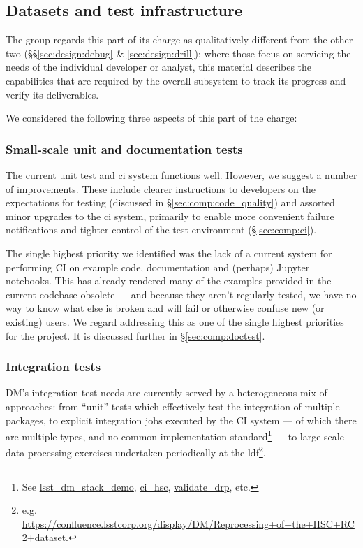 \subsection{Datasets and test infrastructure}
\label{sec:design:test}

The group regards this part of its charge as qualitatively different from the
other two (\S\S\ref{sec:design:debug} \& \ref{sec:design:drill}): where those
focus on servicing the needs of the individual developer or analyst, this
material describes the capabilities that are required by the overall subsystem
to track its progress and verify its deliverables.

We considered the following three aspects of this part of the charge:

\subsubsection{Small-scale unit and documentation tests}

The current unit test and \gls{ci} system functions well. However, we suggest
a number of improvements. These include clearer instructions to developers on
the expectations for testing (discussed in \S\ref{sec:comp:code_quality}) and
assorted minor upgrades to the \gls{ci} system, primarily to enable more
convenient failure notifications and tighter control of the test environment
(\S\ref{sec:comp:ci}).

The single highest priority we identified was the lack of a current system for
performing CI on example code, documentation and (perhaps) Jupyter notebooks.
This has already rendered many of the examples provided in the current
codebase obsolete --- and because they aren't regularly tested, we have no way
to know what else is broken and will fail or otherwise confuse new (or
existing) users. We regard addressing this as one of the single highest
priorities for the project. It is discussed further in
\S\ref{sec:comp:doctest}.

\subsubsection{Integration tests}
\label{sec:design:test:integration}

DM's integration test needs are currently served by a heterogeneous mix of
approaches: from ``unit'' tests which effectively test the integration of
multiple packages, to explicit integration jobs executed by the CI
system --- of which there are multiple types, and no common
implementation standard\footnote{See
\href{https://github.com/lsst/lsst_dm_stack_demo}{lsst\_dm\_stack\_demo},
\href{https://github.com/lsst/ci_hsc}{ci\_hsc},
\href{https://github.com/lsst/validate_drp}{validate\_drp}, etc.} --- to large
scale data processing exercises undertaken periodically at the
\gls{ldf}\footnote{e.g.
\url{https://confluence.lsstcorp.org/display/DM/Reprocessing+of+the+HSC+RC2+dataset}.}.

